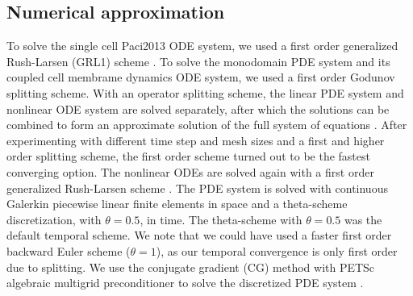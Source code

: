 \documentclass{article}
\begin{document}
\subsection{Numerical approximation} \label{Numerical approximation}
To solve the single cell Paci2013 ODE system, we used a first order generalized Rush-Larsen (GRL1) scheme \cite{rush1978}. To solve the monodomain PDE system and its coupled cell membrame dynamics ODE system, we used a first order Godunov splitting scheme. With an operator splitting scheme, the linear PDE system and nonlinear ODE system are solved separately, after which the solutions can be combined to form an approximate solution of the full system of equations \cite{Sundnes}.  After experimenting with different time step and mesh sizes and a first and higher order splitting scheme, the first order scheme turned out to be the fastest converging option. The nonlinear ODEs are solved again with a first order generalized Rush-Larsen scheme \cite{rush1978}. The PDE system is solved with continuous Galerkin piecewise linear finite elements in space and a theta-scheme discretization, with $\theta=0.5$, in time. The theta-scheme with $\theta=0.5$ was the default temporal scheme. We note that we could have used a faster first order backward Euler scheme ($\theta=1$), as our temporal convergence is only first order due to splitting. We use the conjugate gradient (CG) method with PETSc algebraic multigrid preconditioner to solve the discretized PDE system \cite{petsc-web-page, petsc-user-ref, petsc-efficient}. 
%
\end{document}
